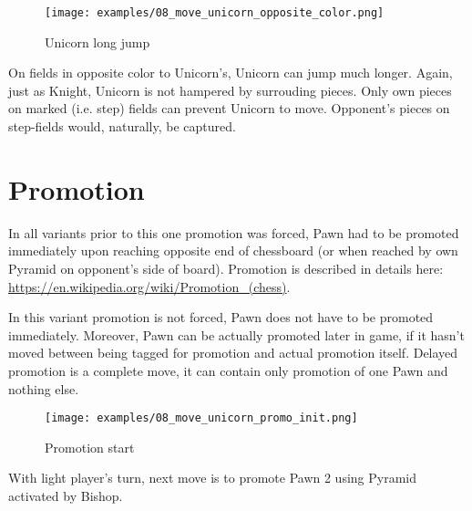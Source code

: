 \clearpage %

\noindent
\begin{figure}[!h]
\texttt{[image: examples/08\_move\_unicorn\_opposite\_color.png]}
\caption{Unicorn long jump}
\label{fig:08_move_unicorn_opposite_color}
\end{figure}

On fields in opposite color to Unicorn's, Unicorn can jump much longer.
Again, just as Knight, Unicorn is not hampered by surrouding pieces.
Only own pieces on marked (i.e. step) fields can prevent Unicorn to move.
Opponent's pieces on step-fields would, naturally, be captured.

\clearpage %

\section*{Promotion}

In all variants prior to this one promotion was forced, Pawn had to be
promoted immediately upon reaching opposite end of chessboard (or when
reached by own Pyramid on opponent's side of board). Promotion is described
in details here: \\
\href{https://en.wikipedia.org/wiki/Promotion\_(chess)}{https://en.wikipedia.org/wiki/Promotion\_(chess)}.

In this variant promotion is not forced, Pawn does not have to be promoted
immediately. Moreover, Pawn can be actually promoted later in game, if it
hasn't moved between being tagged for promotion and actual promotion itself.
Delayed promotion is a complete move, it can contain only promotion of one
Pawn and nothing else.

\clearpage %

\noindent
\begin{figure}[h]
\texttt{[image: examples/08\_move\_unicorn\_promo\_init.png]}
\caption{Promotion start}
\label{fig:08_move_unicorn_promo_init}
\end{figure}

With light player's turn, next move is to promote Pawn 2 using Pyramid
activated by Bishop.

